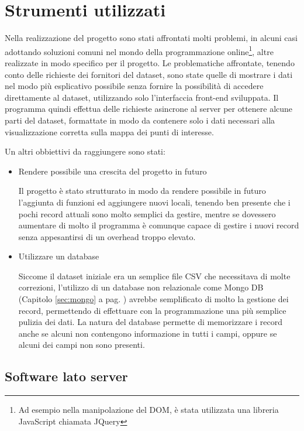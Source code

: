 \chapter{Strumenti utilizzati}
Nella realizzazione del progetto sono stati affrontati molti problemi, in alcuni casi adottando soluzioni comuni nel mondo della programmazione online\footnote{Ad esempio nella manipolazione del DOM, è stata utilizzata una libreria JavaScript chiamata JQuery}, altre realizzate in modo specifico per il progetto. Le problematiche affrontate, tenendo conto delle richieste dei fornitori del dataset, sono state quelle di mostrare i dati nel modo più esplicativo possibile senza fornire la possibilità di accedere direttamente al dataset, utilizzando solo l'interfaccia front-end sviluppata. Il programma quindi effettua delle richieste asincrone al server per ottenere alcune parti del dataset, formattate in modo da contenere solo i dati necessari alla visualizzazione corretta sulla mappa dei punti di interesse.

Un altri obbiettivi da raggiungere sono stati:
\begin{itemize}
	\item Rendere possibile una crescita del progetto in futuro

Il progetto è stato strutturato in modo da rendere possibile in futuro l'aggiunta di funzioni ed aggiungere nuovi locali, tenendo ben presente che i pochi record attuali sono molto semplici da gestire, mentre se dovessero aumentare di molto il programma è comunque capace di gestire i nuovi record senza appesantirsi di un overhead troppo elevato.

	\item Utilizzare un database

Siccome il dataset iniziale era un semplice file CSV che necessitava di molte correzioni, l'utilizzo di un database non relazionale come Mongo DB (Capitolo \ref{sec:mongo} a pag. \pageref{sec:mongo} ) avrebbe semplificato di molto la gestione dei record, permettendo di effettuare con la programmazione una più semplice pulizia dei dati. La natura del database permette di memorizzare i record anche se alcuni non contengono informazione in tutti i campi, oppure se alcuni dei campi non sono presenti.

\end{itemize}


	\section{Software lato server}%
